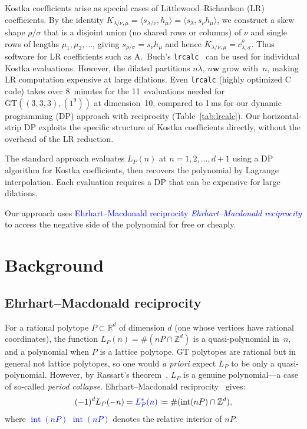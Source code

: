 \documentclass[11pt,reqno]{amsart}
\theoremstyle{definition}
\newcommand{\setZ}{\mathbb{Z}}
\newcommand{\setR}{\mathbb{R}}
\newcommand{\GT}{\mathrm{GT}}
\newcommand{\lam}{\lambda}
\newcommand{\wt}{\mathbf{w}}
\newcommand{\Ehr}{L}
\newcommand{\Ehrstar}{L^{*}}
\DeclareMathOperator{\interior}{int}
\newcommand{\defin}[1]{%
\relax\ifmmode%
\textcolor{blue}{#1}%
\else \textcolor{blue}{\emph{#1}}%
\fi%
}
\begin{document}
Kostka coefficients arise as special cases of Littlewood--Richardson (LR) coefficients.
By the identity $K_{\lam/\nu,\mu} = \langle s_{\lam/\nu}, h_\mu \rangle
= \langle s_\lam, s_\nu h_\mu \rangle$, we construct a skew shape
$\rho/\sigma$ that is a disjoint union (no shared rows or columns) of
$\nu$ and single rows of lengths $\mu_1, \mu_2, \dotsc$, giving
$s_{\rho/\sigma} = s_\nu h_\mu$ and hence
$K_{\lam/\nu,\mu} = c^{\rho}_{\lam, \sigma}$.
Thus software for LR coefficients such as A.~Buch's
\texttt{lrcalc}~\cite{Buch2000} can be used for individual Kostka
evaluations.  However, the dilated partitions $n\lam$, $n\wt$
grow with~$n$, making LR computation expensive at large dilations.
Even \texttt{lrcalc} (highly optimized C code) takes over 8~minutes
for the 11~evaluations needed for $\GT((3,3,3), (1^9))$ at
dimension~10, compared to 1\,ms for our dynamic programming (DP)
approach with reciprocity
(Table~\ref{tab:lrcalc}).  Our horizontal-strip DP exploits the
specific structure of Kostka coefficients directly, without the
overhead of the LR reduction.

The standard approach evaluates $\Ehr_P(n)$ at $n = 1, 2, \dotsc, d+1$
using a DP algorithm for Kostka coefficients, then
recovers the polynomial by Lagrange interpolation.  Each evaluation
requires a DP that can be expensive for large dilations.

Our approach uses \defin{Ehrhart--Macdonald reciprocity} to access the
negative side of the polynomial for free or cheaply.


\section{Background}\label{sec:background}

\subsection{Ehrhart--Macdonald reciprocity}\label{subs:reciprocity}

For a rational polytope $P \subset \setR^d$ of dimension $d$ (one whose
vertices have rational coordinates), the function
$\Ehr_P(n) = \#(nP \cap \setZ^d)$ is a quasi-polynomial in~$n$, and a
polynomial when $P$ is a lattice polytope.  GT polytopes are rational but in general not lattice polytopes,
so one would \emph{a priori} expect $\Ehr_P$ to be only a
quasi-polynomial.  However, by Rassart's theorem~\cite{Rassart2004},
$\Ehr_P$ is a genuine polynomial---a case of so-called \emph{period collapse}.
Ehrhart--Macdonald reciprocity~\cite{Macdonald1971,BeckRobins2015}
gives:
\begin{equation}\label{eq:reciprocity}
  (-1)^d \Ehr_P(-n) = \defin{\Ehrstar_P(n)} \coloneqq \#(\interior(nP) \cap \setZ^d),
\end{equation}
where \defin{$\interior(nP)$} denotes the relative interior of $nP$.
\end{document}
